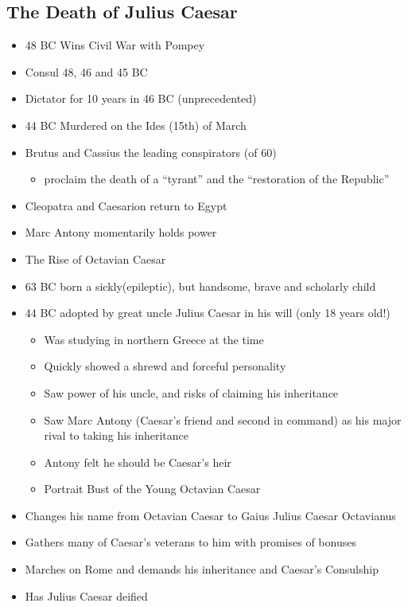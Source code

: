 \documentclass[12pt, twoside]{article}
\begin{document}
\subsection{The Death of Julius Caesar}
\begin{itemize}
\item 48 BC Wins Civil War with Pompey
\item Consul 48, 46 and 45 BC
\item Dictator for 10 years in 46 BC (unprecedented)
\item 44 BC Murdered on the Ides (15th) of March
\item Brutus and Cassius the leading conspirators (of 60)
	\begin{itemize}
	\item proclaim the death of a “tyrant” and the “restoration of the Republic”
	\end{itemize}
\item Cleopatra and Caesarion return to Egypt
\item Marc Antony momentarily holds power
\item The Rise of Octavian Caesar
\item 63 BC born a sickly(epileptic), but handsome, brave and scholarly child
\item 44 BC adopted by great uncle Julius Caesar in his will (only 18 years old!)
	\begin{itemize}
	\item Was studying in northern Greece at the time
	\item Quickly showed a shrewd and forceful personality
	\item Saw power of his uncle, and risks of claiming his inheritance
	\item Saw Marc Antony (Caesar’s friend and second in command) as his major rival to taking his inheritance
	\item Antony felt he should be Caesar’s heir
	\item Portrait Bust of the Young Octavian Caesar
	\end{itemize}
\item Changes his name from Octavian Caesar to Gaius Julius Caesar Octavianus
\item Gathers many of Caesar’s veterans to him with promises of bonuses
\item Marches on Rome and demands his inheritance and Caesar’s Consulship
\item Has Julius Caesar deified
\end{itemize}
\end{document}
